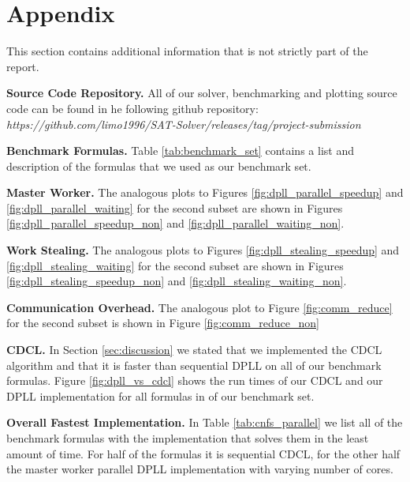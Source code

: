 \documentclass[letterpaper]{article}
\newcommand{\mypar}[1]{{\bf #1.}}
\begin{document}



\newpage
\section{Appendix}
This section contains additional information that is not strictly part of the report.

\mypar{Source Code Repository}
All of our solver, benchmarking and plotting source code can be found in he following github repository:
\textit{https://github.com/limo1996/}\newline\textit{SAT-Solver/releases/tag/project-submission}

\mypar{Benchmark Formulas}
Table \ref{tab:benchmark_set} contains a list and description of the formulas that we used as our benchmark set.

\mypar{Master Worker}
The analogous plots to Figures \ref{fig:dpll_parallel_speedup} and \ref{fig:dpll_parallel_waiting} for the second subset are shown in Figures \ref{fig:dpll_parallel_speedup_non} and \ref{fig:dpll_parallel_waiting_non}.

\mypar{Work Stealing}
The analogous plots to Figures \ref{fig:dpll_stealing_speedup} and \ref{fig:dpll_stealing_waiting} for the second subset are shown in Figures \ref{fig:dpll_stealing_speedup_non} and \ref{fig:dpll_stealing_waiting_non}.

\mypar{Communication Overhead}
The analogous plot to Figure \ref{fig:comm_reduce} for the second subset is shown in Figure \ref{fig:comm_reduce_non}

\mypar{CDCL}
In Section \ref{sec:discussion} we stated that we implemented the CDCL algorithm and that it is faster than sequential DPLL on all of our benchmark formulas.
Figure \ref{fig:dpll_vs_cdcl} shows the run times of our CDCL and our DPLL implementation for all formulas in of our benchmark set.

\mypar{Overall Fastest Implementation}
In Table \ref{tab:cnfs_parallel} we list all of the benchmark formulas with the implementation that solves them in the least amount of time.
For half of the formulas it is sequential CDCL, for the other half the master worker parallel DPLL implementation with varying number of cores.
\end{document}
